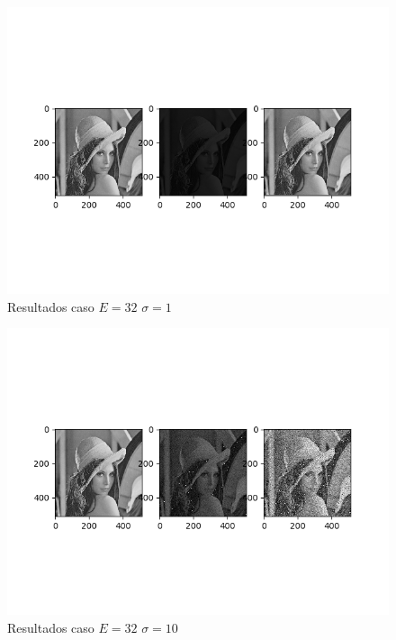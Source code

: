  
\begin{figure}
\includegraphics[scale=0.9]{Imagenes/E32S01}
\centering
\caption{Resultados caso $E=32$ $\sigma = 1$ }
\end{figure}
 
\begin{figure}
\includegraphics[scale=0.9]{Imagenes/E32S10}
\centering
\caption{Resultados caso $E=32$ $\sigma = 10$ }
\end{figure}

